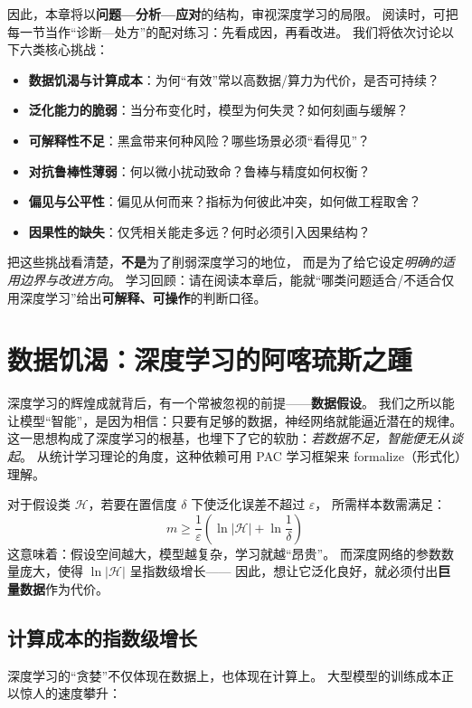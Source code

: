 因此，本章将以\textbf{问题—分析—应对}的结构，审视深度学习的局限。  
阅读时，可把每一节当作“诊断—处方”的配对练习：先看成因，再看改进。  
我们将依次讨论以下六类核心挑战：

\begin{itemize}
\item \textbf{数据饥渴与计算成本}：为何“有效”常以高数据/算力为代价，是否可持续？
\item \textbf{泛化能力的脆弱}：当分布变化时，模型为何失灵？如何刻画与缓解？
\item \textbf{可解释性不足}：黑盒带来何种风险？哪些场景必须“看得见”？
\item \textbf{对抗鲁棒性薄弱}：何以微小扰动致命？鲁棒与精度如何权衡？
\item \textbf{偏见与公平性}：偏见从何而来？指标为何彼此冲突，如何做工程取舍？
\item \textbf{因果性的缺失}：仅凭相关能走多远？何时必须引入因果结构？
\end{itemize}

把这些挑战看清楚，\textbf{不是}为了削弱深度学习的地位，  
而是为了给它设定\textit{明确的适用边界与改进方向}。  
学习回顾：请在阅读本章后，能就“哪类问题适合/不适合仅用深度学习”给出\textbf{可解释、可操作}的判断口径。

\section{数据饥渴：深度学习的阿喀琉斯之踵}

深度学习的辉煌成就背后，有一个常被忽视的前提——\textbf{数据假设}。  
我们之所以能让模型“智能”，是因为相信：只要有足够的数据，神经网络就能逼近潜在的规律。  
这一思想构成了深度学习的根基，也埋下了它的软肋：\textit{若数据不足，智能便无从谈起}。  
从统计学习理论的角度，这种依赖可用 PAC 学习框架来 formalize（形式化）理解。

对于假设类 $\mathcal{H}$，若要在置信度 $\delta$ 下使泛化误差不超过 $\varepsilon$，  
所需样本数需满足：
$$m \geq \frac{1}{\varepsilon}\left(\ln|\mathcal{H}| + \ln\frac{1}{\delta}\right)$$  
这意味着：假设空间越大，模型越复杂，学习就越“昂贵”。  
而深度网络的参数数量庞大，使得 $\ln|\mathcal{H}|$ 呈指数级增长——  
因此，想让它泛化良好，就必须付出\textbf{巨量数据}作为代价。

\subsection{计算成本的指数级增长}

深度学习的“贪婪”不仅体现在数据上，也体现在计算上。  
大型模型的训练成本正以惊人的速度攀升：  

